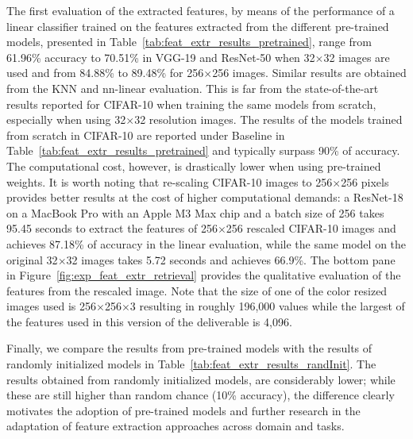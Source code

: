 The first evaluation of the extracted features, by means of the performance of a linear classifier trained on the features extracted from the different pre-trained models, presented in Table~\ref{tab:feat_extr_results_pretrained}, range from 61.96\% accuracy to 70.51\% in VGG-19 and ResNet-50 when 32$\times$32 images are used and from 84.88\% to 89.48\% for 256$\times$256 images. Similar results are obtained from the KNN and nn-linear evaluation. This is far from the state-of-the-art results reported for CIFAR-10 when training the same models from scratch, especially when using 32$\times$32 resolution images. The results of the models trained from scratch in CIFAR-10 are reported under Baseline in Table~\ref{tab:feat_extr_results_pretrained} and typically surpass 90\% of accuracy. The computational cost, however, is drastically lower when using pre-trained weights. It is worth noting that re-scaling CIFAR-10 images to 256$\times$256 pixels provides better results at the cost of higher computational demands: a ResNet-18 on a MacBook Pro with an Apple M3 Max chip and a batch size of 256  takes 95.45 seconds to extract the features of 256$\times$256 rescaled CIFAR-10 images and achieves 87.18\% of accuracy in the linear evaluation, while the same model on the original 32$\times$32 images takes 5.72 seconds and achieves 66.9\%. The bottom pane in Figure~\ref{fig:exp_feat_extr_retrieval} provides the qualitative evaluation of the features from the rescaled image. Note that the size of one of the color resized images used is 256$\times$256$\times$3 resulting in roughly 196,000 values while the largest of the features used in this version of the deliverable is 4,096.

Finally, we compare the results from pre-trained models with the results of randomly initialized models in Table~\ref{tab:feat_extr_results_randInit}. The results obtained from randomly initialized models, are considerably lower; while these are still higher than random chance (10\% accuracy), the difference clearly motivates the adoption of pre-trained models and further research in the adaptation of feature extraction approaches across domain and tasks.

